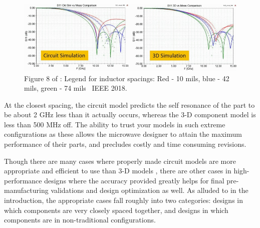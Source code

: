 \documentclass[12pt]{usfcoe}
\begin{document}
    \begin{figure}[H]
        \begin{center}
        \includegraphics[width=\textwidth]{images/mdlx_3d_comps_paper_fig_8.jpg}   
        \caption{Figure 8 of \cite{mdlx_3d_models}: Legend for inductor spacings: Red - 10 mils, blue - 42 mils, green - 74 mils \textcopyright \, IEEE 2018.}
        \label{fig:mdlx3d_comps_paper_fig_8}
        \end{center}
    \end{figure}

    At the closest spacing, the circuit model predicts the self resonance of the part to be about 2 GHz less than it actually occurs, whereas the 3-D component model is less than 500 MHz off.  
    The ability to trust your models in such extreme configurations as these allows the microwave designer to attain the maximum performance of their parts, and precludes costly and time consuming revisions.  
    
    Though there are many cases where properly made circuit models are more appropriate and efficient to use than 3-D models \cite{ltcc_filter}, there are other cases in high-performance designs where the accuracy provided greatly helps for final pre-manufacturing validations and design optimization as well.  
    As alluded to in the introduction, the appropriate cases fall roughly into two categories: designs in which components are very closely spaced together, and designs in which components are in non-traditional configurations. 
\end{document}
